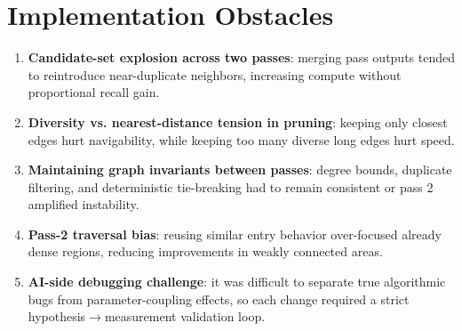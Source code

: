 \documentclass[11pt]{article}
\begin{document}
\section*{Implementation Obstacles}
\begin{enumerate}[leftmargin=*]
    \item \textbf{Candidate-set explosion across two passes}: merging pass outputs tended to reintroduce near-duplicate neighbors, increasing compute without proportional recall gain.
    \item \textbf{Diversity vs. nearest-distance tension in pruning}: keeping only closest edges hurt navigability, while keeping too many diverse long edges hurt speed.
    \item \textbf{Maintaining graph invariants between passes}: degree bounds, duplicate filtering, and deterministic tie-breaking had to remain consistent or pass 2 amplified instability.
    \item \textbf{Pass-2 traversal bias}: reusing similar entry behavior over-focused already dense regions, reducing improvements in weakly connected areas.
    \item \textbf{AI-side debugging challenge}: it was difficult to separate true algorithmic bugs from parameter-coupling effects, so each change required a strict hypothesis$\rightarrow$measurement validation loop.
\end{enumerate}
\end{document}
